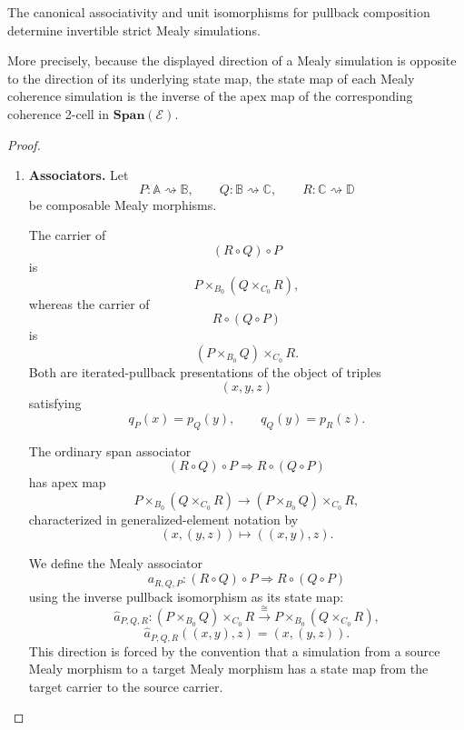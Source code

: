 \begin{lemma}
\label{lem:span-coherence-strict-mealy}
    The canonical associativity and unit isomorphisms for pullback composition
    determine invertible strict Mealy simulations.

    More precisely, because the displayed direction of a Mealy simulation is
    opposite to the direction of its underlying state map, the state map of
    each Mealy coherence simulation is the inverse of the apex map of the
    corresponding coherence 2-cell in \(\mathbf{Span}(\mathcal E)\).
\end{lemma}
\begin{proof}
    \leavevmode
    \begin{enumerate}
        \item \textbf{Associators.}
        Let
        \[
            P:\mathbb A\rightsquigarrow\mathbb B,
            \qquad
            Q:\mathbb B\rightsquigarrow\mathbb C,
            \qquad
            R:\mathbb C\rightsquigarrow\mathbb D
        \]
        be composable Mealy morphisms.

        The carrier of
        \[
            (R\circ Q)\circ P
        \]
        is
        \[
            P\times_{B_0}(Q\times_{C_0}R),
        \]
        whereas the carrier of
        \[
            R\circ(Q\circ P)
        \]
        is
        \[
            (P\times_{B_0}Q)\times_{C_0}R.
        \]
        Both are iterated-pullback presentations of the object of triples
        \[
            (x,y,z)
        \]
        satisfying
        \[
            q_P(x)=p_Q(y),
            \qquad
            q_Q(y)=p_R(z).
        \]

        The ordinary span associator
        \[
            (R\circ Q)\circ P
            \Longrightarrow
            R\circ(Q\circ P)
        \]
        has apex map
        \[
            P\times_{B_0}(Q\times_{C_0}R)
            \longrightarrow
            (P\times_{B_0}Q)\times_{C_0}R,
        \]
        characterized in generalized-element notation by
        \[
            (x,(y,z))
            \longmapsto
            ((x,y),z).
        \]

        We define the Mealy associator
        \[
            a_{R,Q,P}:
            (R\circ Q)\circ P
            \Rightarrow
            R\circ(Q\circ P)
        \]
        using the inverse pullback isomorphism as its state map:
        \[
            \widehat a_{P,Q,R}:
            (P\times_{B_0}Q)\times_{C_0}R
            \xrightarrow{\cong}
            P\times_{B_0}(Q\times_{C_0}R),
        \]
        \[
            \widehat a_{P,Q,R}((x,y),z)
            =
            (x,(y,z)).
        \]
        This direction is forced by the convention that a simulation from a
        source Mealy morphism to a target Mealy morphism has a state map from
        the target carrier to the source carrier.


\end{enumerate}
\end{proof}
